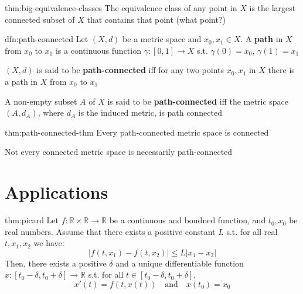 \documentclass[landscape, 8pt]{extarticle}
\begin{document}
\begin{multicols}{3}
\begin{thm}{thm:big-equivalence-classes}{}
    The equivalence class of any point in $X$ is the largest connected subset of $X$ that contains that point (what point?)
\end{thm}

\begin{dfn}{dfn:path-connected}{}
    Let $(X, d)$ be a metric space and $x_{0}, x_{1}\in X$. A \textbf{path} in $X$ from $x_{0}$ to $x_{1}$ is a continuous function $\gamma : [0, 1] \to X$ s.t. $\gamma(0) = x_{0}$, $\gamma(1) = x_{1}$

    $(X, d)$ is said to be \textbf{path-connected} iff for any two points $x_{0}, x_{1}$ in $X$ there is a path in $X$ from $x_{0}$ to $x_{1}$

    A non-empty subset $A$ of $X$ is said to be \textbf{path-connected} iff the metric space $(A, d_{A})$, where $d_{A}$ is the induced metric, is path connected
\end{dfn}

\begin{thm}{thm:path-connected-thm}{}
    Every path-connected metric space is connected

    Not every connected metric space is necessarily path-connected
\end{thm}


\section{Applications}




\begin{thm}{thm:picard}{}
    Let $f : \mathbb{R} \times \mathbb{R} \to \mathbb{R}$ be a continuous and boudned function, and $t_{0}, x_{0}$ be real numbers. Assume that there exists a positive constant $L$ s.t. for all real $t, x_{1}, x_{2}$ we have:
    \[\lvert f(t, x_{1}) - f(t, x_{2}) \rvert \le L\lvert x_{1} - x_{2} \rvert\]
    Then, there exists a positive $\delta$ and a unique differentiable function $x : [t_{0} - \delta, t_{0} + \delta]\to \mathbb{R}$ s.t. for all $t\in [t_{0}-\delta, t_{0} + \delta]$,
    \[x'(t) = f(t, x(t)) \quad \text{and} \quad x(t_{0}) = x_{0}\]
\end{thm}



\end{multicols}
\end{document}
